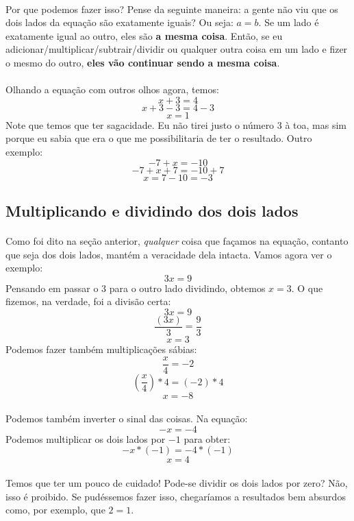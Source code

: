 \documentclass[11pt]{article}
\begin{document}
\paragraph{}
Por que podemos fazer isso? Pense da seguinte maneira: a gente não viu que os
dois lados da equação são exatamente iguais? Ou seja: $a = b$. Se um lado é
exatamente igual ao outro, eles são \textbf{a mesma coisa}. Então, se eu
adicionar/multiplicar/subtrair/dividir ou qualquer outra coisa em um lado e 
fizer o mesmo do outro, \textbf{eles vão continuar sendo a mesma coisa}.
\paragraph{}
Olhando a equação com outros olhos agora, temos:
$$x + 3 = 4$$
$$x + 3 - 3 = 4 - 3$$
$$x = 1$$
Note que temos que ter sagacidade. Eu não tirei justo o número $3$ à toa, mas
sim porque eu sabia que era o que me possibilitaria de ter o resultado. Outro
exemplo:
$$-7 + x = -10$$
$$-7 + x + 7 = -10 + 7$$
$$x = 7 - 10 = -3$$

\subsection{Multiplicando e dividindo dos dois lados}
\paragraph{}
Como foi dito na seção anterior, \emph{qualquer} coisa que façamos na equação,
contanto que seja dos dois lados, mantém a veracidade dela intacta. Vamos
agora ver o exemplo:
$$3x = 9$$
Pensando em passar o $3$ para o outro lado dividindo, obtemos $x = 3$. O que
fizemos, na verdade, foi a divisão certa:
$$3x = 9$$
$$\frac{(3x)}{3} = \frac{9}{3}$$
$$x = 3$$
Podemos fazer também multiplicações sábias:
$$\frac{x}{4} = -2$$
$$\left(\frac{x}{4}\right)*4 = (-2)*4$$
$$x = -8$$
\paragraph{}
Podemos também inverter o sinal das coisas. Na equação:
$$-x = -4$$
Podemos multiplicar os dois lados por $-1$ para obter:
$$-x*(-1) = -4*(-1)$$
$$x = 4$$
\paragraph{}
Temos que ter um pouco de cuidado! Pode-se dividir os dois lados por zero? Não,
isso é proibido. Se pudéssemos fazer isso, chegaríamos a resultados bem 
absurdos como, por exemplo, que $2 = 1$.
\end{document}
